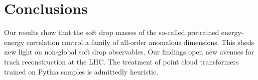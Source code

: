 \section{Conclusions}\label{sec:conclusions}

Our results show that the soft drop masses of the so-called pretrained
energy-energy correlation control a family of all-order anomalous
dimensions. This sheds new light on non-global soft drop observables.
Our findings open new avenues for track reconstruction at the LHC. The
treatment of point cloud transformers trained on Pythia samples is
admittedly heuristic.

